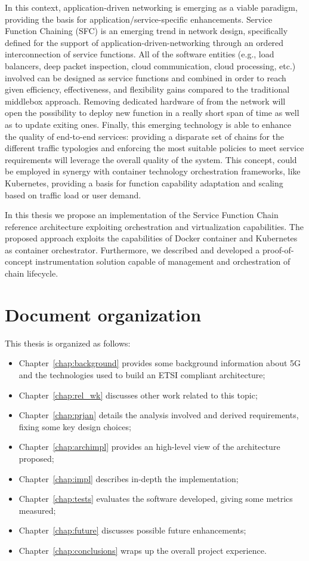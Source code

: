In this context, application-driven networking is emerging as a viable
paradigm, providing the basis for application/service-specific enhancements. 
Service Function Chaining (SFC) is an emerging trend  in network design,
specifically defined for the support of application-driven-networking through an
ordered interconnection of service functions. All of the software entities
(e.g., load balancers, deep packet inspection, cloud communication, cloud
processing, etc.) involved can be designed as service functions and combined in
order to reach given efficiency, effectiveness, and flexibility gains compared
to the traditional middlebox approach. Removing dedicated hardware of from the
network will open the possibility to deploy new function in a really short span
of time as well as to update exiting ones. Finally, this emerging technology is
able to enhance the quality of end-to-end services: providing a disparate set of
chains for the different traffic typologies and enforcing the most suitable
policies to meet service requirements will leverage the overall quality of the
system. This concept, could be employed in synergy with container technology
orchestration frameworks, like Kubernetes, providing a basis for function
capability adaptation and scaling based on traffic load or
user demand.

In this thesis we propose an implementation of the Service Function Chain
reference architecture exploiting orchestration and virtualization capabilities.
The proposed approach exploits the capabilities of Docker container and
Kubernetes as container orchestrator. Furthermore, we described and developed a
proof-of-concept instrumentation solution capable of management and
orchestration of chain lifecycle.

\section*{Document organization}

This thesis is organized as follows:
\begin{itemize}
  \item Chapter~\ref{chap:background} provides some background information
  about 5G and the technologies used to build an ETSI compliant architecture;
  \item Chapter~\ref{chap:rel_wk} discusses other work related to this topic;
  \item Chapter~\ref{chap:prjan} details the analysis involved and derived
  requirements, fixing some key design choices;
  \item Chapter~\ref{chap:archimpl} provides an high-level view of
  the architecture proposed;
  \item Chapter~\ref{chap:impl} describes in-depth the implementation;
  \item Chapter~\ref{chap:tests} evaluates the software developed, giving some
  metrics measured;
  \item Chapter~\ref{chap:future} discusses possible future enhancements;
  \item Chapter~\ref{chap:conclusions} wraps up the overall project experience.
\end{itemize}